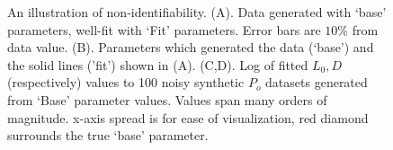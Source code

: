 \documentclass{article}
\newcommand\Po{P_o}
\newcommand{\lo}{L_0}
\begin{document}
\begin{figure}
\begin{subfigure}[b]{0.6\linewidth}
{
}

\end{subfigure}

\hspace{.6cm}
\captionsetup{width=1.15\linewidth}
\caption{An illustration of non-identifiability.  (A). Data generated with `base' parameters, well-fit with `Fit' parameters.  Error bars are $10\%$ from data value.  (B). Parameters which generated the data (`base') and the solid lines ('fit') shown in (A).  (C,D).  Log of fitted $\lo, D$ (respectively) values to 100 noisy synthetic $\Po$ datasets generated from `Base' parameter values.  Values span many orders of magnitude. x-axis spread is for ease of visualization, red diamond surrounds the true `base' parameter.}
\end{figure}

\pagebreak



\bigskip

\bigskip

\bigskip



\end{document}

